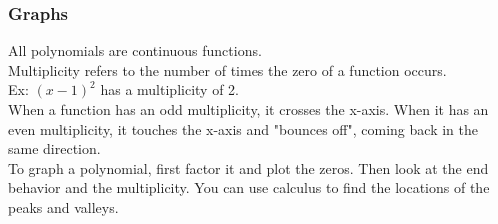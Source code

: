 \subsubsection{Graphs}
All polynomials are continuous functions.\\
Multiplicity refers to the number of times the zero of a function occurs.\\
Ex: $(x-1)^2$ has a multiplicity of 2.\\
When a function has an odd multiplicity, it crosses the x-axis. When it has an even multiplicity, it touches the x-axis and "bounces off", coming back in the same direction.\\
To graph a polynomial, first factor it and plot the zeros. Then look at the end behavior and the multiplicity. You can use calculus to find the locations of the peaks and valleys.
